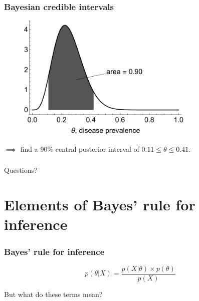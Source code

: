 \documentclass[handout]{beamer}
\begin{document}
\begin{frame}
	\frametitle{Bayesian credible intervals}
	
	\begin{figure}[ht]
		\centerline{\includegraphics[width=0.75\textwidth]{animations_figures/binomial_credible_interval.pdf}}
	\end{figure}
	
	$\implies$ find a 90\% central posterior interval of $0.11\leq\theta\leq 0.41$.
	
\end{frame}

\begin{frame}
	\frametitle{}
	{\Huge Questions?}
\end{frame}

\section{Elements of Bayes' rule for inference}
\frame{\tableofcontents[currentsection]}

\begin{frame}
	\frametitle{Bayes' rule for inference}
	
	
	\begin{equation}
	p(\theta|X) = \frac{p(X|\theta)\times p(\theta)}{p(X)}
	\end{equation}
	
	But what do these terms mean?
	
\end{frame}
\end{document}
